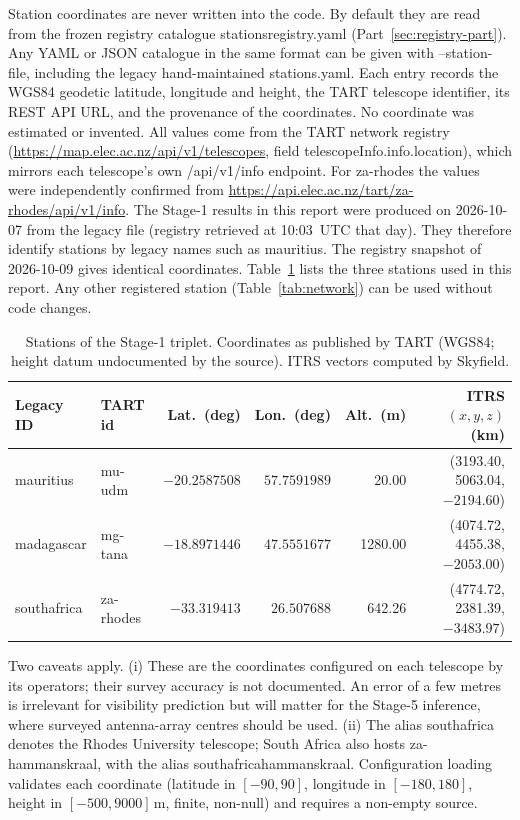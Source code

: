 \documentclass[11pt,a4paper]{article}
\newcommand{\code}[1]{{\ttfamily\def\_{\textunderscore\allowbreak}#1}}
\begin{document}
Station coordinates are never written into the code. By default they are
read from the frozen registry catalogue \code{stations\_registry.yaml}
(Part~\ref{sec:registry-part}). Any YAML or JSON catalogue in the same format
can be given with \code{--station-file}, including the legacy hand-maintained
\code{stations.yaml}. Each entry records the WGS84 geodetic latitude,
longitude and height, the TART telescope identifier, its REST API URL, and
the provenance of the coordinates. No coordinate was estimated or invented.
All values come from the TART network registry
(\url{https://map.elec.ac.nz/api/v1/telescopes}, field
\code{telescopeInfo.info.location}), which mirrors each telescope's own
\code{/api/v1/info} endpoint. For \code{za-rhodes} the values were
independently confirmed from
\url{https://api.elec.ac.nz/tart/za-rhodes/api/v1/info}. The Stage-1
results in this report were produced on 2026-10-07 from the legacy file
(registry retrieved at 10:03~UTC that day). They therefore identify
stations by legacy names such as \code{mauritius}. The registry snapshot of
2026-10-09 gives identical coordinates. Table~\ref{tab:stations} lists the
three stations used in this report. Any other registered station
(Table~\ref{tab:network}) can be used without code changes.

\begin{table}[h]
\centering
\caption{Stations of the Stage-1 triplet. Coordinates as published by TART
(WGS84; height datum undocumented by the source). ITRS vectors computed by
Skyfield.}
\label{tab:stations}
\small
\begin{tabular}{llrrrr}
\toprule
Legacy ID & TART id & Lat.\ (deg) & Lon.\ (deg) & Alt.\ (m) & ITRS $(x,y,z)$ (km)\\
\midrule
\code{mauritius}    & \code{mu-udm}    & $-20.2587508$ & $57.7591989$ & 20.00   & (3193.40, 5063.04, $-2194.60$)\\
\code{madagascar}   & \code{mg-tana}   & $-18.8971446$ & $47.5551677$ & 1280.00 & (4074.72, 4455.38, $-2053.00$)\\
\code{south\_africa} & \code{za-rhodes} & $-33.319413$  & $26.507688$  & 642.26  & (4774.72, 2381.39, $-3483.97$)\\
\bottomrule
\end{tabular}
\end{table}

Two caveats apply. (i) These are the coordinates configured on each
telescope by its operators; their survey accuracy is not documented. An
error of a few metres is irrelevant for visibility prediction but will matter
for the Stage-5 inference, where surveyed antenna-array centres should be
used. (ii) The alias \code{south\_africa} denotes the Rhodes University
telescope; South Africa also hosts \code{za-hammanskraal}, with the alias
\code{south\_africa\_hammanskraal}. Configuration loading validates each
coordinate (latitude in $[-90,90]$, longitude in $[-180,180]$, height in
$[-500,9000]$\,m, finite, non-null) and requires a non-empty \code{source}.
\end{document}
